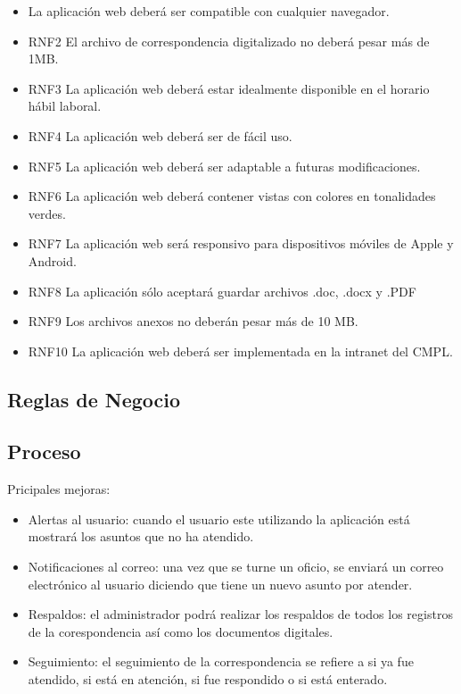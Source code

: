 \begin{itemize}
	\item La aplicación web deberá ser compatible con cualquier navegador.
	\item RNF2 El archivo de correspondencia digitalizado no deberá pesar más de 1MB.
	\item RNF3 La aplicación web deberá estar idealmente disponible en el horario hábil laboral.
	\item RNF4 La aplicación web deberá ser de fácil uso.
	\item RNF5 La aplicación web deberá ser adaptable a futuras modificaciones.
	\item RNF6 La aplicación web deberá contener vistas con colores en tonalidades verdes.
	\item RNF7 La aplicación web será responsivo para dispositivos móviles de Apple y Android.
	\item RNF8 La aplicación sólo aceptará guardar archivos .doc, .docx y .PDF
	\item RNF9 Los archivos anexos no deberán pesar más de 10 MB.
	\item RNF10 La aplicación web deberá ser implementada en la intranet del CMPL.
\end{itemize}

\subsection{Reglas de Negocio}

\subsection{Proceso}
Pricipales mejoras: \\ 

\begin{itemize}
	\item Alertas al usuario: cuando el usuario este utilizando la aplicación está mostrará los asuntos que no ha atendido. 
	\item Notificaciones al correo: una vez que se turne un oficio, se enviará un correo electrónico al usuario diciendo que tiene un nuevo asunto por atender. 
	\item Respaldos: el administrador podrá realizar los respaldos de todos los registros de la corespondencia así como los documentos digitales.
	\item Seguimiento: el seguimiento de la correspondencia se refiere a si ya fue atendido, si está en atención, si fue respondido o si está enterado.
\end{itemize}

